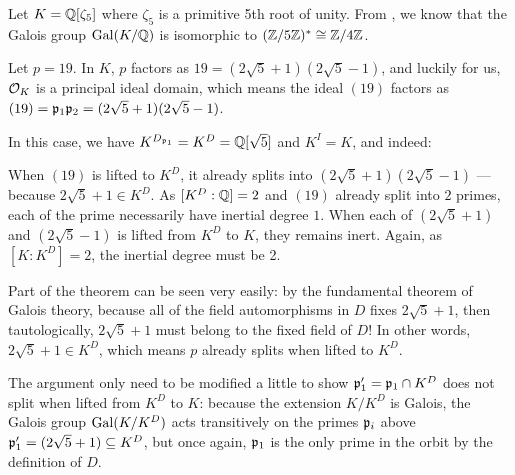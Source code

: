 \begin{example}
	Let $K = \mathbb Q[\zeta_5]$ where $\zeta_5$ is a primitive 5th root of unity.
	From , we know that the Galois group $\operatorname{Gal}(K/\mathbb Q)$ is isomorphic to
	$(\mathbb Z/5\mathbb Z)^\ast \cong \mathbb Z/4\mathbb Z$.

	Let $p = 19$. In $K$, $p$ factors as $19 = (2 \sqrt 5+1)(2 \sqrt 5-1)$,
	and luckily for us, $\mathcal O_K$ is a principal ideal domain, which means the ideal $(19)$ factors as
	$(19) = \mathfrak p_1 \mathfrak p_2 = (2 \sqrt 5+1)(2 \sqrt 5-1)$.

	In this case, we have $K^{D_{\mathfrak p_1}} = K^D = \mathbb Q[\sqrt 5]$ and $K^I = K$, and indeed:
	\begin{itemize}
		\ii When $(19)$ is lifted to $K^D$, it already splits into $(2 \sqrt 5+1)(2 \sqrt 5-1)$ ---
		because $2 \sqrt 5+1 \in K^D$. As $[K^D: \mathbb Q] = 2$ and $(19)$ already split into $2$
		primes, each of the prime necessarily have inertial degree $1$.
		\ii When each of $(2 \sqrt 5+1)$ and $(2 \sqrt 5-1)$ is lifted from $K^D$ to $K$, they
		remains inert. Again, as $[K: K^D] = 2$, the inertial degree must be 2.
	\end{itemize}

	Part of the theorem can be seen very easily:
	by the fundamental theorem of Galois theory, because all of the field automorphisms in $D$ fixes
	$2 \sqrt 5+1$, then tautologically, $2 \sqrt 5+1$ must belong to the fixed field of $D$!
	In other words, $2 \sqrt 5+1 \in K^D$, which means $p$ already splits when lifted to $K^D$.

	The argument only need to be modified a little to show $\mathfrak p_1' = \mathfrak p_1 \cap K^D$ does not split
	when lifted from $K^D$ to $K$: because the extension $K/K^D$ is Galois,
	the Galois group $\operatorname{Gal}(K/K^D)$ acts transitively on the primes $\mathfrak p_i$ above $\mathfrak p'_1 = (2
	\sqrt 5+1) \subseteq K^D$, but once again, $\mathfrak p_1$ is the only prime in the orbit
	by the definition of $D$.
\end{example}

